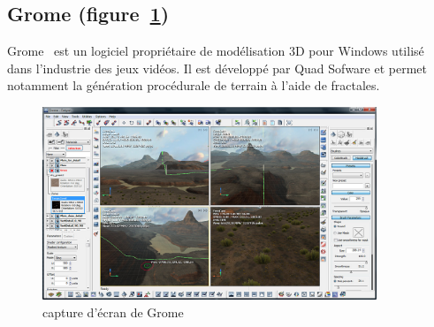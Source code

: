 \subsection{Grome (figure~\ref{fig:grome})}
Grome~\cite{Grome} est un logiciel propriétaire de modélisation 3D pour Windows utilisé dans l'industrie des jeux vidéos. Il est développé par Quad Sofware et permet
notamment la génération procédurale de terrain à l'aide de fractales.
\begin{figure}[!ht]
    \begin{center}
        \includegraphics[width=10cm]{resources/grome.jpg}
        \caption{capture d'écran de Grome}
        \label{fig:grome}
    \end{center}
\end{figure}
